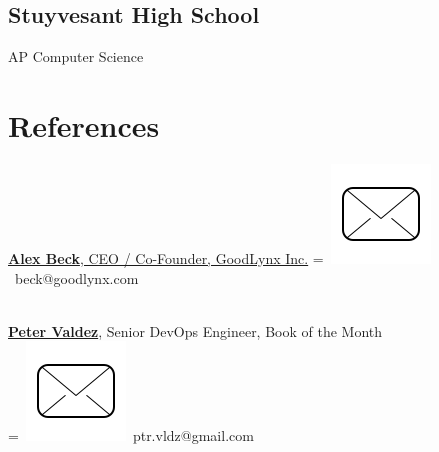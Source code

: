 \documentclass[]{plushcv}
\begin{document}
\begin{minipage}[t]{0.25\textwidth}
\sectionsep
\subsection{Stuyvesant High School}
AP Computer Science \\
\sectionsep


\section{References} 
\href{https://www.linkedin.com/in/alex-beck-07095793/}{\textbf{Alex Beck}, CEO / Co-Founder, GoodLynx Inc.}
\begingroup
{}=\hbox{
\includegraphics[scale=0.1,trim={0 1cm 0cm 0cm}]{icons/main/mail.png}\hspace{0.3cm} beck@goodlynx.com
}
\parbox{\wd0}{}
\endgroup
\\
\sectionsep
\href{https://www.linkedin.com/in/peter-valdez/}{\textbf{Peter Valdez}}, Senior DevOps Engineer, Book of the Month 
\\
\begingroup
{}=\hbox{
\includegraphics[scale=0.1,trim={0 1cm 0cm 0cm}]{icons/main/mail.png}\hspace{0.3cm} ptr.vldz@gmail.com
}
\parbox{\wd0}{}
\endgroup
\\


\end{minipage} 
\end{document}
